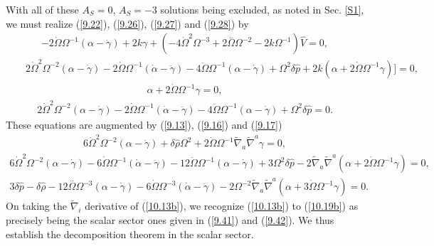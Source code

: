 \documentclass[aps,onecolumn,10pt]{revtex4}
\numberwithin{equation}{section}
\numberwithin{equation}{section}
\begin{document}
With all of these $A_S=0$, $A_S=-3$ solutions being excluded, as noted in Sec. \ref{S1}, we must realize (\ref{9.22}), (\ref{9.26}), (\ref{9.27}) and (\ref{9.28}) by 
%
\begin{eqnarray}
-2 \dot{\Omega} \Omega^{-1} (\alpha - \dot\gamma) + 2 k \gamma 
+(-4 \dot{\Omega}^2 \Omega^{-3}  + 2 \overset{..}{\Omega} \Omega^{-2}  - 2 k \Omega^{-1}) \hat{V}=0,
\label{10.13b}
\end{eqnarray}
%
%
\begin{eqnarray}
&&2 \dot{\Omega}^2 \Omega^{-2}(\alpha-\dot\gamma)
-2  \dot{\Omega} \Omega^{-1}(\dot\alpha -\ddot\gamma)-4\ddot\Omega\Omega^{-1}(\alpha-\dot\gamma)+ \Omega^2 \delta \hat{p}
 + 2 k(\alpha + 2 \dot{\Omega}  \Omega^{-1} \gamma)]=0,
\label{10.14b}
\end{eqnarray}
%
%
\begin{eqnarray}
\alpha+2\dot{\Omega}\Omega^{-1}\gamma=0,
\label{10.15b}
 \end{eqnarray}
\begin{eqnarray}
 2 \dot{\Omega}^2 \Omega^{-2}(\alpha-\dot\gamma)
-2  \dot{\Omega} \Omega^{-1}(\dot\alpha -\ddot\gamma)-4\ddot\Omega\Omega^{-1}(\alpha-\dot\gamma)+ \Omega^2 \delta \hat{p}=0.
\label{10.16b}
\end{eqnarray}
%
%
These equations are augmented by (\ref{9.13}), (\ref{9.16}) and (\ref{9.17})
%
\begin{eqnarray}
 6 \dot{\Omega}^2 \Omega^{-2}(\alpha-\dot\gamma) + \delta \hat{\rho} \Omega^2 + 2 \dot{\Omega} \Omega^{-1} \tilde{\nabla}_{a}\tilde{\nabla}^{a}\gamma=0, 
\label{10.17b}
\end{eqnarray}
%
%
\begin{eqnarray}
 6 \dot{\Omega}^2 \Omega^{-2}(\alpha-\dot\gamma)
-6  \dot{\Omega} \Omega^{-1}(\dot\alpha -\ddot\gamma)-12\ddot\Omega\Omega^{-1}(\alpha-\dot\gamma)+ 3\Omega^2 \delta \hat{p}-2\tilde\nabla_a\tilde\nabla^a(\alpha + 2\dot\Omega \Omega^{-1}\gamma)=0,
\label{10.18b}
\end{eqnarray}
%
%
\begin{eqnarray}
3 \delta \hat{p}-  \delta \hat{\rho}
-12 \overset{..}{\Omega}  \Omega^{-3}(\alpha - \dot\gamma) -6 \dot{\Omega} \Omega^{-3}(\dot{\alpha} -\ddot\gamma)
-2 \Omega^{-2} \tilde{\nabla}_{a}\tilde{\nabla}^{a}(\alpha +3\dot\Omega\Omega^{-1}\gamma)=0.
\label{10.19b}
\end{eqnarray}
%
On taking the $\tilde{\nabla}_i$ derivative of (\ref{10.13b}), we recognize (\ref{10.13b}) to (\ref{10.19b})  as precisely being the scalar sector ones given in (\ref{9.41}) and (\ref{9.42}). We thus establish the decomposition theorem in the scalar sector. 
\end{document}
